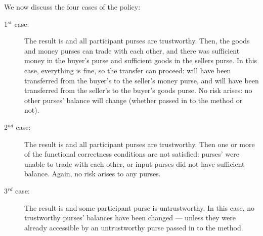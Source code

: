 We now discuss the four cases of the policy:

\begin{description}

\item [1$^{st}$ case:] The result is  and all participant
  purses are trustworthy. Then, the goods and money purses
  can trade with each other, and there was sufficient
  money in the buyer's purse and sufficient goods in the sellers purse.
  In this case, everything is fine, so the transfer can proceed:
   will have been transferred from the buyer's to the
  seller's money purse, and  will have been transferred from
  the seller's to the buyer's goods purse.
  No risk arises:
  no other
  purses' balance will change (whether passed in to
  the method or not).


\item [2$^{nd}$ case:] The result is  and all participant purses are trustworthy. Then
one or more of  the functional correctness conditions are
  not satisfied: purses' were unable to trade with each other, or input
  purses did not have sufficient balance. Again, no risk arises
  to any purses.


\item [3$^{rd}$ case:] The result is  and some participant purse is untrustworthy.
  In this case, no   trustworthy purses' balances have been changed --- unless
  they were already accessible by an untrustworthy purse passed in to
  the method.


\end{description}
